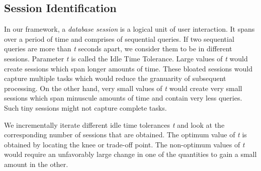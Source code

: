 \subsection{Session Identification}
\label{sec:session}

In our framework, a \textit{database session} is a logical unit of user interaction. It spans over a period of time and comprises of sequential queries. If two sequential queries are more than \textit{t} seconds apart, we consider them to be in different sessions. Parameter \textit{t} is called the Idle Time Tolerance. 
Large values of \textit{t} would create sessions which span longer amounts of time. These bloated sessions would capture multiple tasks which would reduce the granuarity of subsequent processing. On the other hand, very small values of \textit{t} would create very small sessions which span minuscule amounts of time and contain very less queries. Such tiny sessions might not capture complete tasks.

We incrementally iterate different idle time tolerances \textit{t} and look at the corresponding number of sessions that are obtained. The optimum value of \textit{t} is obtained by locating the knee or trade-off point. The non-optimum values of \textit{t} would require an unfavorably large change in one of the quantities to gain a small amount in the other. 





